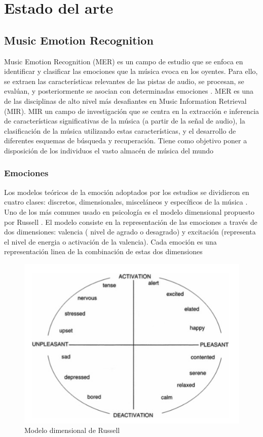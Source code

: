 \documentclass[12pt,a4paper,Spanish]{book}
\begin{document}
\chapter{Estado del arte}
\section{Music Emotion Recognition}

Music Emotion Recognition (MER) es un campo de estudio que se enfoca en identificar y clasificar las emociones que la música evoca en los oyentes. Para ello, se extraen las características relevantes de las pistas de audio, se procesan, se evalúan, y posteriormente se asocian con determinadas emociones \cite{GomezCanon2021SPM}.
\newline
MER es una de las disciplinas de alto nivel más desafiantes en Music Information Retrieval (MIR). MIR un campo de investigación que se centra en la extracción e inferencia de características significativas de la música (a partir de la señal de audio), la clasificación de la música utilizando estas características, y el desarrollo de diferentes esquemas de búsqueda y recuperación. Tiene como objetivo poner a disposición de los individuos el vasto almacén de música del mundo \cite{schedl2014music}

\subsection{Emociones}

Los modelos teóricos de la emoción adoptados por los estudios se dividieron en cuatro clases: discretos, dimensionales, misceláneos y específicos de la música \cite{eerola2012review}. 
\newline
Uno de los más comunes usado en psicología es el modelo dimensional propuesto por Russell \cite{posner2005circumplex}. El modelo consiste en la representación de las emociones a través de dos dimensiones: valencia ( nivel de agrado o desagrado) y excitación (representa el nivel de energia o activación de la valencia). Cada emoción es una representación linea de la combinación de estas dos dimensiones

\begin{figure}[h]
	\centering
	\includegraphics[width=0.7\linewidth]{figs/russell}
	\caption{Modelo dimensional de Russell}
	\label{fig:russell}
\end{figure}
\end{document}
